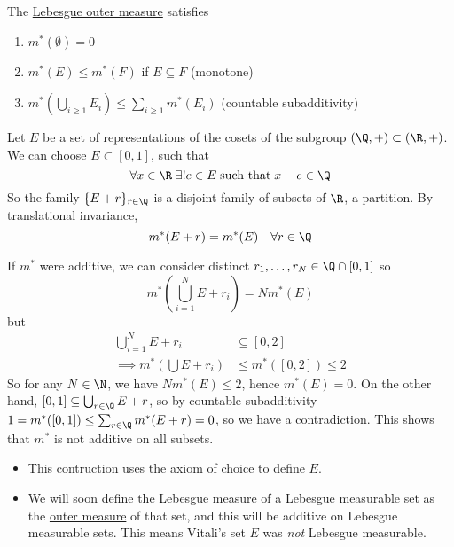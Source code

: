 \documentclass{article}
\newcommand{\1}[1]{\mathbbm{1}_{#1}}
\begin{document}
The \hyperlink{def:lebOutMeas}{Lebesgue outer measure} satisfies
\begin{enumerate}
    \item $m^*(\emptyset) = 0$
    \item $m^*(E) \leq m^*(F)$ if $E \subseteq F$ (monotone)
    \item $m^*\left(\bigcup_{i \geq 1} E_i\right) \leq \sum_{i \geq 1} m^* (E_i)$ (countable subadditivity)
\end{enumerate}

\begin{eg}
    Let $E$ be a set of representations of the cosets of the subgroup $(\Q, +) \subset (\R, +)$. We can choose $E \subset [0, 1]$, such that
    \begin{equation*}
        \forall x \in \R \; \exists! e \in E \; \text{such that} \; x - e \in \Q
    \end{equation*}
    So the family $\{E + r\}_{r \in \Q}$ is a disjoint family of subsets of $\R$, a partition.
    By translational invariance, \begin{equation*}m^*(E + r) = m^*(E) \quad \forall r \in \Q\end{equation*}

    If $m^*$ were additive, we can consider distinct $r_1, \dotsc, r_N \in \Q \cap [0, 1]$ so
    \begin{equation*}
        m^*\left(\bigcup_{i=1}^N E + r_i\right) = N m^*(E)
    \end{equation*}
    but
    \begin{align*}
        \bigcup_{i=1}^N E + r_i &\subseteq [0, 2] \\
        \implies m^*\left(\bigcup E + r_i\right) &\leq m^*([0, 2]) \leq 2
    \end{align*}
    So for any $N \in \N$, we have $N m^*(E) \leq 2$, hence $m^*(E) = 0$.
    On the other hand, $[0, 1] \subseteq \bigcup_{r \in \Q} E + r$, so by countable subadditivity $1 = m^*([0, 1]) \leq \sum_{r \in \Q} m^*(E + r) = 0$, so we have a contradiction.
    This shows that $m^*$ is not additive on all subsets.
\end{eg}

\begin{remark} \leavevmode
    \begin{itemize}
        \item This contruction uses the axiom of choice to define $E$.
        \item We will soon define the Lebesgue measure of a Lebesgue measurable set as the \hyperlink{def:lebOutMeas}{outer measure} of that set, and this will be additive on Lebesgue measurable sets.  This means Vitali's set $E$ was \emph{not} Lebesgue measurable.
    \end{itemize}
\end{remark}
\end{document}

